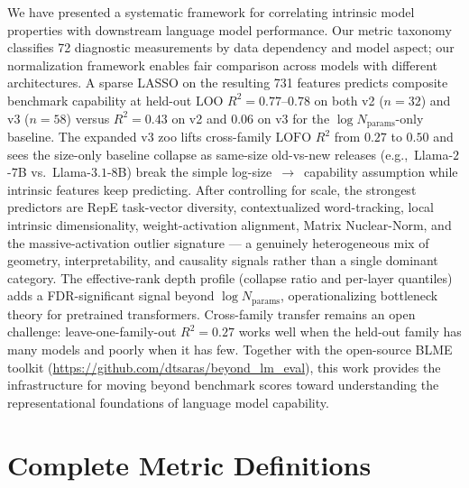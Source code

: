 \documentclass[preprint]{neurips_2025}
\begin{document}
We have presented a systematic framework for correlating intrinsic model properties with downstream language model performance.
Our metric taxonomy classifies 72 diagnostic measurements by data dependency and model aspect; our normalization framework enables fair comparison across models with different architectures.
A sparse LASSO on the resulting 731 features predicts composite benchmark capability at held-out $\text{LOO } R^2 = 0.77$--$0.78$ on both v2 ($n=32$) and v3 ($n=58$) versus $R^2 = 0.43$ on v2 and $0.06$ on v3 for the $\log N_{\text{params}}$-only baseline. The expanded v3 zoo lifts cross-family $\text{LOFO } R^2$ from $0.27$ to $0.50$ and sees the size-only baseline collapse as same-size old-vs-new releases (e.g.,\ Llama-$2$-$7$B vs.\ Llama-$3.1$-$8$B) break the simple log-size~$\to$~capability assumption while intrinsic features keep predicting.
After controlling for scale, the strongest predictors are RepE task-vector diversity, contextualized word-tracking, local intrinsic dimensionality, weight-activation alignment, Matrix Nuclear-Norm, and the massive-activation outlier signature --- a genuinely heterogeneous mix of geometry, interpretability, and causality signals rather than a single dominant category.
The effective-rank depth profile (collapse ratio and per-layer quantiles) adds a FDR-significant signal beyond $\log N_{\text{params}}$, operationalizing bottleneck theory for pretrained transformers.
Cross-family transfer remains an open challenge: leave-one-family-out $R^2 = 0.27$ works well when the held-out family has many models and poorly when it has few.
Together with the open-source BLME toolkit (\url{https://github.com/dtsaras/beyond_lm_eval}), this work provides the infrastructure for moving beyond benchmark scores toward understanding the representational foundations of language model capability.




\newpage
\appendix

\section{Complete Metric Definitions}
\label{app:metrics}
\end{document}
